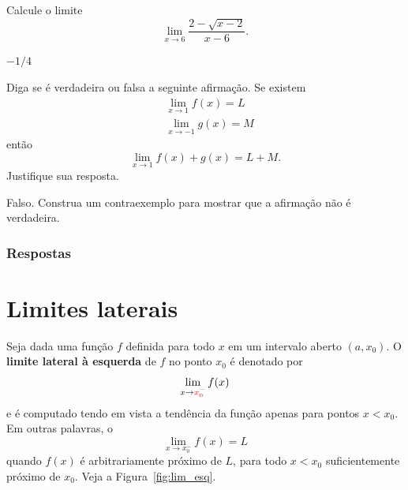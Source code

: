 \begin{exer}
  Calcule o limite
  \begin{equation}
    \lim_{x\to 6} \frac{2-\sqrt{x-2}}{x-6}.
  \end{equation}
\end{exer}
\begin{resp}
  $-1/4$
\end{resp}

\begin{exer}
  Diga se é verdadeira ou falsa a seguinte afirmação. Se existem
  \begin{align}
    & \lim_{x\to 1} f(x) = L \\
    & \lim_{x\to -1} g(x) = M
  \end{align}
  então
  \begin{equation}
    \lim_{x\to 1} f(x) + g(x) = L + M.
  \end{equation}
  Justifique sua resposta.
\end{exer}
\begin{resp}
  Falso. Construa um contraexemplo para mostrar que a afirmação não é verdadeira. 
\end{resp}

\ifisbook
\subsubsection{Respostas}
\shipoutAnswer
\fi


\section{Limites laterais}\label{cap_lim_sec_lateral}

Seja dada uma função $f$ definida para todo $x$ em um intervalo aberto $(a, x_0)$. O {\bf limite lateral à esquerda} de $f$ no ponto $x_0$ é denotado por
\begin{equation}
  \lim_{x\to {\color{red}x_0^-}} f(x)
\end{equation}
e é computado tendo em vista a tendência da função apenas para pontos $x<x_0$. Em outras palavras, o
\begin{equation}
  \lim_{x\to x_0^-} f(x) = L
\end{equation}
quando $f(x)$ é arbitrariamente próximo de $L$, para todo $x<x_0$ suficientemente próximo de $x_0$. Veja a Figura~\ref{fig:lim_esq}.

